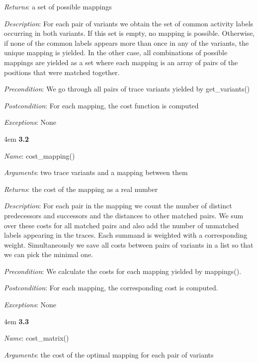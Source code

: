 \documentclass[notitlepage]{article}
\begin{document}
\begin{flushleft}
\textit{Returns}: a set of possible mappings

\textit{Description}: For each pair of variants we obtain the set of common activity labels occurring in both variants. If this set is empty, no mapping is possible. Otherwise, if none of the common labels appears more than once in any of the variants, the unique mapping is yielded. In the other case, all combinations of possible mappings are yielded as a set where each mapping is an array of pairs of the positions that were matched together.

\textit{Precondition}: We go through all pairs of trace variants yielded by get\_variants()

\textit{Postcondition}: For each mapping, the cost function is computed

\textit{Exceptions}: None
\par
\endgroup


\medskip

\par
\begingroup
\leftskip4em
\textbf{3.2} 

\textit{Name}: cost\_mapping()

\textit{Arguments}: two trace variants and a mapping between them

\textit{Returns}: the cost of the mapping as a real number

\textit{Description}: For each pair in the mapping we count the number of distinct predecessors and successors and the distances to other matched pairs. We sum over these costs for all matched pairs and also add the number of unmatched labels appearing in the traces. Each summand is weighted with a corresponding weight.
Simultaneously we save all costs between pairs of variants in a list so that we can pick the minimal one.

\textit{Precondition}: We calculate the costs for each mapping yielded by mappings().

\textit{Postcondition}: For each mapping, the corresponding cost is computed.

\textit{Exceptions}: None
\par
\endgroup


\medskip

\par
\begingroup
\leftskip4em
\textbf{3.3} 

\textit{Name}: cost\_matrix()

\textit{Arguments}: the cost of the optimal mapping for each pair of variants


\end{flushleft}
\end{document}
